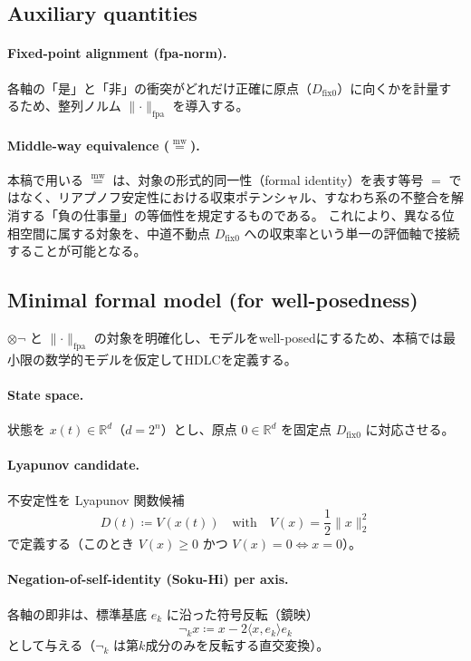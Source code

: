 \documentclass[12pt,a4paper]{article}
\newcommand{\dfix}{D_{\text{fix0}}}
\newcommand{\mweq}{\mathrel{\overset{\mathrm{mw}}{=}}}
\begin{document}
\subsection{Auxiliary quantities}
\paragraph{Fixed-point alignment (fpa-norm).}
各軸の「是」と「非」の衝突がどれだけ正確に原点（$\dfix$）に向くかを計量するため、整列ノルム $\lVert\cdot\rVert_{\mathrm{fpa}}$ を導入する。

\paragraph{Middle-way equivalence ($\mweq$).}
本稿で用いる $\mweq$ は、対象の形式的同一性（formal identity）を表す等号 $=$ ではなく、リアプノフ安定性における収束ポテンシャル、すなわち系の不整合を解消する「負の仕事量」の等価性を規定するものである。
これにより、異なる位相空間に属する対象を、中道不動点 $\dfix$ への収束率という単一の評価軸で接続することが可能となる。

\subsection{Minimal formal model (for well-posedness)}
$\otimes\neg$ と $\lVert\cdot\rVert_{\mathrm{fpa}}$ の対象を明確化し、モデルをwell-posedにするため、本稿では最小限の数学的モデルを仮定してHDLCを定義する。

\paragraph{State space.}
状態を $x(t)\in\mathbb{R}^d$（$d=2^n$）とし、原点 $0\in\mathbb{R}^d$ を固定点 $\dfix$ に対応させる。

\paragraph{Lyapunov candidate.}
不安定性を Lyapunov 関数候補
\begin{equation}
  D(t) \coloneqq V(x(t)) \quad \text{with}\quad V(x)=\frac{1}{2}\lVert x\rVert_2^2
  \label{eq:V_def}
\end{equation}
で定義する（このとき $V(x)\ge 0$ かつ $V(x)=0\Leftrightarrow x=0$）。

\paragraph{Negation-of-self-identity (Soku-Hi) per axis.}
各軸の即非は、標準基底 $e_k$ に沿った符号反転（鏡映）
\begin{equation}
  \neg_k x \coloneqq x - 2\langle x,e_k\rangle e_k
  \label{eq:neg_k}
\end{equation}
として与える（$\neg_k$ は第$k$成分のみを反転する直交変換）。
\end{document}
